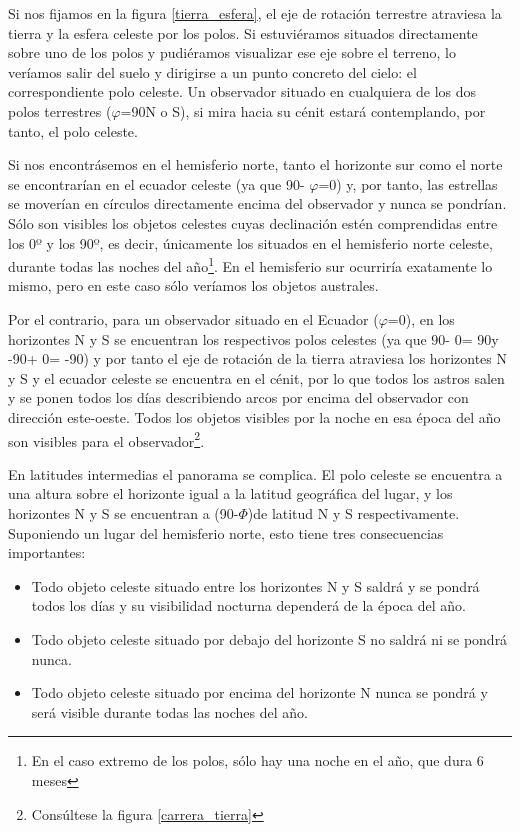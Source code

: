\documentclass[11pt,a5paper,twoside]{amsbook}
\begin{document}
Si nos fijamos en la figura \ref{tierra_esfera}, el eje de rotación terrestre atraviesa la tierra y la esfera celeste por los polos. Si estuviéramos situados directamente sobre uno de los polos y pudiéramos visualizar ese eje sobre el terreno, lo veríamos salir del suelo y dirigirse a un punto concreto del cielo: el correspondiente polo celeste. Un observador situado en cualquiera de los dos polos terrestres ($\varphi$=90\textdegree  N o S), si mira hacia su cénit estará contemplando, por tanto, el polo celeste.

Si nos encontrásemos en el hemisferio norte, tanto el horizonte sur como el norte se encontrarían en el ecuador celeste (ya que 90\textdegree - $\varphi$=0\textdegree) y, por tanto, las estrellas se moverían en círculos directamente encima del  observador y nunca se pondrían. Sólo son visibles los objetos celestes cuyas declinación estén comprendidas entre los 0º y los 90º, es decir, únicamente los situados en el hemisferio norte celeste, durante todas las noches del año\footnote{En el caso extremo de los polos, sólo hay una noche en el año, que dura 6 meses}. En el hemisferio sur ocurriría exatamente lo mismo, pero en este caso sólo veríamos los objetos australes.

Por el contrario, para un observador situado en el Ecuador ($\varphi$=0\textdegree), en los horizontes N y S se encuentran los respectivos polos celestes (ya que 90\textdegree - 0\textdegree = 90\textdegree y -90\textdegree + 0\textdegree = -90\textdegree) y por tanto el eje de rotación de la tierra atraviesa los horizontes N y S y el ecuador celeste se encuentra en el cénit, por lo que todos los astros salen y se ponen todos los días describiendo arcos por encima del observador con dirección este-oeste. Todos los objetos visibles por la noche en esa época del año son visibles para el observador\footnote{Consúltese la figura \ref{carrera_tierra}}.

En latitudes intermedias el panorama se complica. El polo celeste se encuentra a una altura sobre el horizonte igual a la latitud geográfica del lugar, y los horizontes N y S se encuentran a (90-$\Phi$)\textdegree de latitud N y S respectivamente. Suponiendo un lugar del hemisferio norte, esto tiene tres consecuencias importantes:

\begin{itemize}
 \item Todo objeto celeste situado entre los horizontes N y S saldrá y se pondrá todos los días y su visibilidad nocturna dependerá de la época del año.
 \item Todo objeto celeste situado por debajo del horizonte S no saldrá ni se pondrá nunca.
 \item Todo objeto celeste situado por encima del horizonte N nunca se pondrá y será visible durante todas las noches del año.
\end{itemize}
\end{document}
